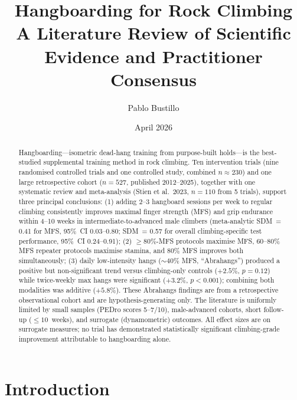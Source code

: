 \documentclass[12pt,a4paper]{article}
\title{\textbf{Hangboarding for Rock Climbing}\\[0.3em]
\large A Literature Review of Scientific Evidence and Practitioner Consensus}
\author{Pablo Bustillo}
\date{April 2026}
\begin{document}
\maketitle

\begin{abstract}
Hangboarding---isometric dead-hang training from purpose-built holds---is the best-studied supplemental training method in rock climbing. Ten intervention trials (nine randomised controlled trials and one controlled study, combined $n \approx 230$) and one large retrospective cohort ($n = 527$, published 2012--2025), together with one systematic review and meta-analysis (Stien et al.\ 2023, $n = 110$ from 5 trials), support three principal conclusions: (1) adding 2--3 hangboard sessions per week to regular climbing consistently improves maximal finger strength (MFS) and grip endurance within 4--10 weeks in intermediate-to-advanced male climbers (meta-analytic SDM~= 0.41 for MFS, 95\%~CI 0.03--0.80; SDM~= 0.57 for overall climbing-specific test performance, 95\%~CI 0.24--0.91); (2) $\geq\!80\%$-MFS protocols maximise MFS, 60--80\% MFS repeater protocols maximise stamina, and 80\% MFS improves both simultaneously; (3) daily low-intensity hangs (${\sim}40\%$ MFS, ``Abrahangs'') produced a positive but non-significant trend versus climbing-only controls ($+2.5\%$, $p = 0.12$) while twice-weekly max hangs were significant ($+3.2\%$, $p < 0.001$); combining both modalities was additive ($+5.8\%$). These Abrahangs findings are from a retrospective observational cohort and are hypothesis-generating only. The literature is uniformly limited by small samples (PEDro scores 5--7/10), male-advanced cohorts, short follow-up ($\leq10$~weeks), and surrogate (dynamometric) outcomes. All effect sizes are on surrogate measures; no trial has demonstrated statistically significant climbing-grade improvement attributable to hangboarding alone.
\end{abstract}

\section{Introduction}
\end{document}
